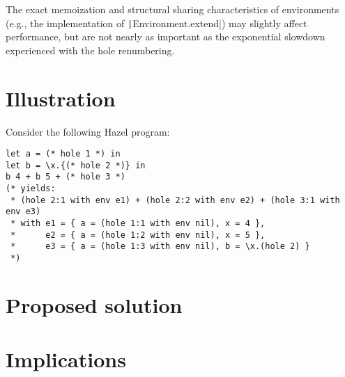 \documentclass{article}
\begin{document}
The exact memoization and structural sharing characteristics of environments (e.g., the implementation of \texttt|Environment.extend|) may slightly affect performance, but are not nearly as important as the exponential slowdown experienced with the hole renumbering.

\section{Illustration}
Consider the following Hazel program:

\begin{verbatim}
let a = (* hole 1 *) in
let b = \x.{(* hole 2 *)} in
b 4 + b 5 + (* hole 3 *)
(* yields:
 * (hole 2:1 with env e1) + (hole 2:2 with env e2) + (hole 3:1 with env e3)
 * with e1 = { a = (hole 1:1 with env nil), x = 4 },
 *      e2 = { a = (hole 1:2 with env nil), x = 5 },
 *      e3 = { a = (hole 1:3 with env nil), b = \x.(hole 2) }
 *)
\end{verbatim}


\section{Proposed solution}


\section{Implications}
\end{document}
